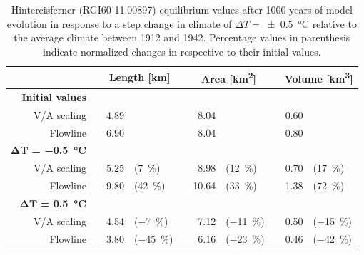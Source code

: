     
    \begin{table}[htp]
      \centering
      \small

      \caption{Hintereisferner (RGI60-11.00897) equilibrium values after 1000 years of model evolution in response to a step change in climate of $\Delta T = $\SI{\pm0.5}{\celsius} relative to the average climate between 1912 and 1942. Percentage values in parenthesis indicate normalized changes in respective to their initial values.}
      \label{tab:hintereisferner_equilibrium_values}
      
      \begin{tabular}{@{}rcrlcrlcrl@{}}
        \toprule
        {} & \phantom{a} & \multicolumn{2}{c}{\textbf{Length [\si{\kilo\meter}]}} & \phantom{a} & \multicolumn{2}{c}{\textbf{Area [\si{\square\kilo\meter}]}} & \phantom{a} & \multicolumn{2}{c}{\textbf{Volume [\si{\cubic\kilo\meter}]}} \\
        \midrule
        \textbf{Initial values} \\
        V/A scaling & \phantom{a} & 4.89 & & \phantom{a} & 8.04 & & \phantom{a} & 0.60 & \\
        Flowline & \phantom{a} &  6.90 & & \phantom{a} & 8.04 & & \phantom{a} & 0.80 & \\
        $\bm{\Delta T}$\textbf{ = \SI{-0.5}{\celsius}} \\
        V/A scaling & \phantom{a} & 5.25 & (\SI{+7}{\percent}) & \phantom{a} & 8.98 & (\SI{+12}{\percent}) & \phantom{a} & 0.70 & (\SI{+17}{\percent}) \\
        Flowline & \phantom{a} &  9.80 & (\SI{+42}{\percent}) & \phantom{a} & 10.64 & (\SI{+33}{\percent}) & \phantom{a} &  1.38 & (\SI{+72}{\percent}) \\
        \addlinespace
        $\bm{\Delta T}$\textbf{ = \SI{+0.5}{\celsius}} \\
        V/A scaling & \phantom{a} & 4.54 & (\SI{-7}{\percent}) & \phantom{a} & 7.12 & (\SI{-11}{\percent}) & \phantom{a} & 0.50 & (\SI{-15}{\percent}) \\
        Flowline & \phantom{a} &   3.80 & (\SI{-45}{\percent}) & \phantom{a} & 6.16 & (\SI{-23}{\percent}) & \phantom{a} & 0.46 & (\SI{-42}{\percent}) \\
        \bottomrule
      \end{tabular}
    \end{table}


